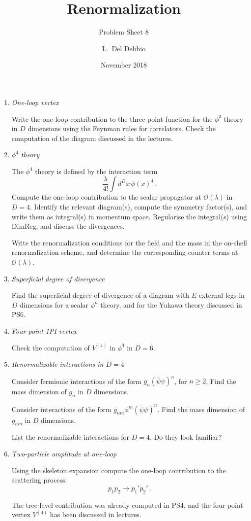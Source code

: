 \documentclass{tutorial}
\subtitle{Problem Sheet 8}
\title{Renormalization}
\author{L.~Del Debbio}
\date{November 2018}
\newcommand{\psibar}{\bar{\psi}}
\begin{document}
\maketitle

\begin{enumerate}
\item \emph{ One-loop vertex}

  Write the one-loop contribution to the three-point function for the
  $\phi^3$ theory in $D$ dimensions using the Feynman rules for
  correlators. Check the computation of the diagram discussed in the
  lectures. 
  
\item \emph{ $\phi^4$ theory}

  The $\phi^4$ theory is defined by the interaction term
  \[
    \frac{\lambda}{4!} \int d^Dx\, \phi(x)^4\, .
  \]
  Compute the one-loop contribution to the scalar propagator at
  $\mathcal{O}(\lambda)$ in $D=4$. Identify the relevant diagram(s), compute the symmetry
  factor(s), and write them as integral(s) in momentum space. Regularise
  the integral(s) using DimReg, and discuss the divergences.

  Write the renormalization conditions for the field and the mass in
  the on-shell renormalization scheme, and determine the corresponding
  counter terms at $\mathcal{O}(\lambda)$.

\item \emph{ Superficial degree of divergence}

  Find the superficial degree of divergence of a diagram with $E$
  external legs in $D$ dimensions for a scalar $\phi^n$ theory, and for
  the Yukawa theory discussed in PS6.
  
\item \emph{ Four-point 1PI vertex}
  
  Check the computation of $V^{(4)}$ in $\phi^3$ in $D=6$.
  
\item \emph{ Renormalizable interactions in $D=4$}
  
  Consider fermionic interactions of the form $g_n (\psibar\psi)^n$,
  for $n \geq 2$. Find the mass dimension of $g_n$ in $D$ dimensions.
  
  Consider interactions of the form $g_{nm} \phi^m
  (\psibar\psi)^n$. Find the mass dimension of $g_{nm}$ in $D$
  dimensions.
  
  List the renormalizable interactions for $D=4$. Do they look
  familiar? 

\item \emph{ Two-particle amplitude at one-loop}

  Using the skeleton expansion compute the one-loop contribution to
  the scattering process:
  \[
    p_1 p_2 \rightarrow p_1' p_2'\, .
  \]

  The tree-level contribution was already computed in PS4, and the
  four-point vertex $V^{(4)}$ has been discussed in lectures.
  
\end{enumerate}
\end{document}
